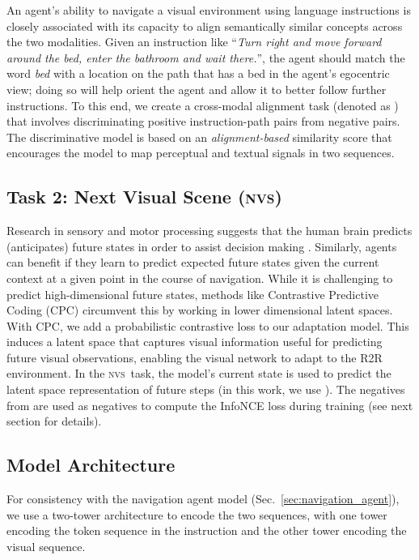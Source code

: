 \documentclass[10pt,twocolumn,letterpaper]{article}
\newcommand{\tasknvs}{\textsc{nvs}}
\begin{document}
An agent's ability to navigate a visual environment using language instructions is closely associated with its capacity to align semantically similar concepts across the two modalities. Given an instruction like ``\textit{Turn right and move forward around the bed, enter the bathroom and wait there.}'', the agent should match the word \textit{bed} with a location on the path that has a bed in the agent's egocentric view; doing so will help orient the agent and allow it to better follow further instructions. To this end, we create a cross-modal alignment task (denoted as {\taskcma}) that involves discriminating positive instruction-path pairs from negative pairs. The discriminative model is based on an \textit{alignment-based} similarity score that encourages the model to map perceptual and textual signals in two sequences. 


\subsection{Task 2: Next Visual Scene (\tasknvs)}

Research in sensory and motor processing suggests that the human brain predicts (anticipates) future states in order to assist decision making \cite{Luca2016Optimal,Bubic2010Prediction}. Similarly, agents can benefit if they learn to predict expected future states given the current context at a given point in the course of navigation.
While it is challenging to predict high-dimensional future states, methods like Contrastive Predictive Coding (CPC) \cite{Oord2018RepresentationLW} circumvent this by working in lower dimensional latent spaces.
With CPC, we add a probabilistic contrastive loss to our adaptation model. This induces a latent space that captures visual information useful for predicting future visual observations, enabling the visual network to adapt to the R2R environment. In the \tasknvs\ task, the model's current state is used to predict the latent space representation of future  steps (in this work, we use ).
The negatives from {\taskcma} are used as negatives to compute the InfoNCE \cite{Oord2018RepresentationLW} loss during training (see next section for details).


\subsection{Model Architecture}
\label{subsec:model_arch}
For consistency with the navigation agent model (Sec.~\ref{sec:navigation_agent}), we use a two-tower architecture to encode the two sequences, with one tower encoding the token sequence in the instruction and the other tower encoding the visual sequence.
\end{document}
